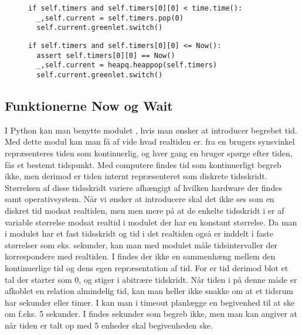 \begin{figure}[hbtp]
\begin{minipage}[c]{\linewidth}
\begin{lstlisting}[firstnumber=204, label=sched_timer, caption=Udvælgelse af proces fra listen timers (fra scheduling.py)]
if self.timers and self.timers[0][0] < time.time():
  _,self.current = self.timers.pop(0)
  self.current.greenlet.switch()
\end{lstlisting}
\end{minipage}
\begin{minipage}[c]{\linewidth}
\begin{lstlisting}[firstnumber=124, label=sim_timer, caption=Udvælgelse af proces fra listen timers (fra simulation.py)]
if self.timers and self.timers[0][0] <= Now():
  assert self.timers[0][0] == Now()
  _,self.current = heapq.heappop(self.timers)
  self.current.greenlet.switch()
\end{lstlisting}
\end{minipage}
\end{figure}

\subsection{Funktionerne Now og Wait}
 I Python kan man benytte modulet 
, hvis man ønsker at introducer begrebet tid. Med dette
modul kan man få af vide hvad realtiden er. fra en brugers synsvinkel
repræsenteres tiden som kontinuerlig, og hver gang en bruger spørge
efter tiden, fås et bestemt tidspunkt. Med computere findes tid som
kontinuerligt begreb ikke, men derimod er tiden internt repræsenteret
som diskrete tidsskridt. Størrelsen af disse tidsskridt variere
afhængigt af hvilken hardware der findes samt operativsystem.
Når vi ønsker at introducere \des skal det ikke ses som en diskret
tid modsat realtiden, men men mere på at de enkelte tidsskridt i \des er af
variable størrelse modsat  realtid i  modulet  der har en konstant
størrelse. Da man i  modulet har et fast tidsskridt og
tid i det realtiden også er inddelt i faste størrelser
som eks. sekunder, kan man med  modulet måle tidsintervaller der
korrespondere med realtiden. I \des findes der ikke en
sammenhæng mellem den kontinuerlige tid og dens egen repræsentation af
tid. For \des er tid derimod blot et tal der starter som 0, og stiger
i abitrære tidskridt. Når tiden i \des på denne måde er afkoblet
en relation almindelig tid, kan man heller ikke snakke om at et tidsrum
har sekunder eller timer. I \pycsp kan man i timeout planlægge en
begivenhed til at ske om f.eks. 5 sekunder. I \des findes sekunder som
begreb ikke, men man kan angiver at når tiden  er talt op med 5 enheder skal
begivenheden ske. 

